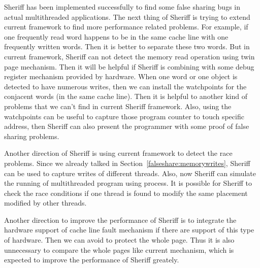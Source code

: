 \label{futurework}
Sheriff has been implemented successfully to find some false sharing bugs in actual multithreaded applications.
The next thing of Sheriff is trying to extend current framework to find more performance related problems. 
For example, if one frequently read word happens to be in the same cache line with one frequently written words. 
Then it is better to separate these two words. But in current framework, Sheriff can not detect the memory read 
operation using twin page mechanism.
Then it will be helpful if Sheriff is combining with some debug register mechanism provided by hardware. When one
word or one object is detected to have numerous writes, then we 
can install the watchpoints for the conjacent words (in the same cache line). 
Then it is helpful to another kind of problems that we can't find in current Sheriff framework.
Also, using the watchpoints can be useful to capture those program counter to touch specific address, then
Sheriff can also present the programmer with some proof of false sharing problems. 

Another direction of Sheriff is using current framework to detect the race problems. Since we already talked in
Section~\ref{falseshare:memorywrites}, Sheriff can be used to capture writes of different threads. 
Also, now Sheriff can simulate the running of multithreaded program using process.
It is possible for Sheriff to check the race conditions if one thread is found to modify the same placement 
modified by other threads. 

Another direction to improve the performance of Sheriff is to integrate the 
hardware support of cache line fault 
mechanism if there are support of this type of hardware. 
Then we can avoid to protect the whole page. Thus 
it is also unnecessary to compare the whole pages like current mechanism, 
which is expected to improve the performance of Sheriff greately.

